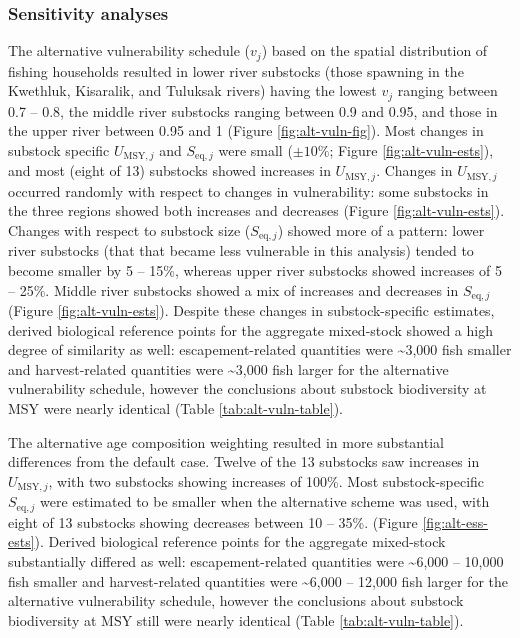 \documentclass[12pt,]{book}
\theoremstyle{definition}
\theoremstyle{definition}
\theoremstyle{definition}
\theoremstyle{remark}
\begin{document}
\subsubsection{Sensitivity analyses}\label{sensitivity-analyses-1}

\noindent
The alternative vulnerability schedule (\(v_j\)) based on the spatial
distribution of fishing households resulted in lower river substocks
(those spawning in the Kwethluk, Kisaralik, and Tuluksak rivers) having
the lowest \(v_j\) ranging between 0.7 -- 0.8, the middle river
substocks ranging between 0.9 and 0.95, and those in the upper river
between 0.95 and 1 (Figure \ref{fig:alt-vuln-fig}). Most changes in
substock specific \(U_{\text{MSY},j}\) and \(S_{\text{eq},j}\) were
small (\(\pm 10\%\); Figure \ref{fig:alt-vuln-ests}), and most (eight of
13) substocks showed increases in \(U_{\text{MSY},j}\). Changes in
\(U_{\text{MSY},j}\) occurred randomly with respect to changes in
vulnerability: some substocks in the three regions showed both increases
and decreases (Figure \ref{fig:alt-vuln-ests}). Changes with respect to
substock size (\(S_{\text{eq},j}\)) showed more of a pattern: lower
river substocks (that that became less vulnerable in this analysis)
tended to become smaller by 5 -- 15\%, whereas upper river substocks
showed increases of 5 -- 25\%. Middle river substocks showed a mix of
increases and decreases in \(S_{\text{eq},j}\) (Figure
\ref{fig:alt-vuln-ests}). Despite these changes in substock-specific
estimates, derived biological reference points for the aggregate
mixed-stock showed a high degree of similarity as well:
escapement-related quantities were \textasciitilde{}3,000 fish smaller
and harvest-related quantities were \textasciitilde{}3,000 fish larger
for the alternative vulnerability schedule, however the conclusions
about substock biodiversity at MSY were nearly identical (Table
\ref{tab:alt-vuln-table}).

The alternative age composition weighting resulted in more substantial
differences from the default case. Twelve of the 13 substocks saw
increases in \(U_{\text{MSY},j}\), with two substocks showing increases
of 100\%. Most substock-specific \(S_{\text{eq},j}\) were estimated to
be smaller when the alternative scheme was used, with eight of 13
substocks showing decreases between 10 -- 35\%. (Figure
\ref{fig:alt-ess-ests}). Derived biological reference points for the
aggregate mixed-stock substantially differed as well: escapement-related
quantities were \textasciitilde{}6,000 -- 10,000 fish smaller and
harvest-related quantities were \textasciitilde{}6,000 -- 12,000 fish
larger for the alternative vulnerability schedule, however the
conclusions about substock biodiversity at MSY still were nearly
identical (Table \ref{tab:alt-vuln-table}).
\end{document}
